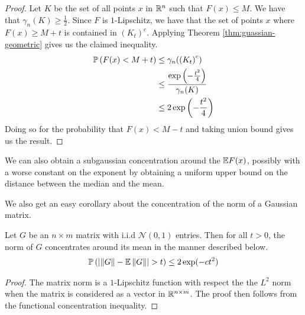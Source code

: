 \documentclass[11pt]{article}
\begin{document}
\begin{proof}
  Let $K$ be the set of all points $x$ in $\R^n$ such that $F(x) \leq M$.
  We have that $\gamma_n(K) \geq \frac{1}{2}$.
  Since $F$ is $1$-Lipschitz, we have that the set of points $x$ where $F(x) \geq M+t$ is contained in $\left( K_t \right)^c$.
  Applying Theorem \ref{thm:guassian-geometric} gives us the claimed inequality.
  \begin{align*}
    \P\left( F(x) < M + t \right) &\leq \gamma_n(\left( K_t \right)^c) \\
                                  &\leq \frac{\exp\left( - \frac{t^2}{4} \right)}{\gamma_n(K)} \\
    &\leq 2 \exp\left( - \frac{t^2}{4} \right)
  \end{align*}
  Doing so for the probability that $F(x) < M - t$ and taking union bound gives us the result.
\end{proof}
\begin{remark}
  We can also obtain a subgaussian concentration around the $\E F(x)$, possibly with a worse constant on the exponent by obtaining a uniform upper bound on the distance between the median and the mean.
\end{remark}

We also get an easy corollary about the concentration of the norm of a Gaussian matrix.
\begin{corollary}
  Let $G$ be an $n \times m$ matrix with i.i.d $\mathcal{N}(0, 1)$ entries.
  Then for all $t > 0$, the norm of $G$ concentrates around its mean in the manner described below.
  \begin{align*}
    \P\left( \left| \norm{G} - \E \norm{G} \right| > t \right) \leq 2 \exp(-ct^2)
  \end{align*}
\end{corollary}
\begin{proof}
  The matrix norm is a $1$-Lipschitz function with respect the the $L^2$ norm when the matrix is considered as a vector in $\R^{n \times m}$.
  The proof then follows from the functional concentration inequality.
\end{proof}

\printbibliography
\end{document}
